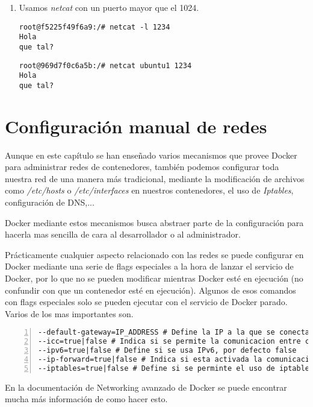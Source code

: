 \begin{enumerate}
\begin{enumerate}
			\item Usamos \textit{netcat} con un puerto mayor que el 1024.
			\begin{lstlisting}[style=consola]
root@f5225f49f6a9:/# netcat -l 1234
Hola
que tal?
			\end{lstlisting}
			\begin{lstlisting}[style=consola]
root@969d7f0c6a5b:/# netcat ubuntu1 1234
Hola
que tal?
			\end{lstlisting}
		\end{enumerate}
	\end{enumerate}
	
	\section{Configuración manual de redes}
	Aunque en este capítulo se han enseñado varios mecanismos que provee Docker para administrar redes de contenedores, también podemos configurar toda nuestra red de una manera más tradicional, mediante la modificación de archivos como \emph{/etc/hosts} o \emph{/etc/interfaces} en nuestros contenedores, el uso de \emph{Iptables}, configuración de DNS,... 
	
	Docker mediante estos mecanismos busca abstraer parte de la configuración para hacerla mas sencilla de cara al desarrollador o al administrador.
	
	Prácticamente cualquier aspecto relacionado con las redes se puede configurar en Docker mediante una serie de flags especiales a la hora de lanzar el servicio de Docker, por lo que no se pueden modificar mientras Docker esté en ejecución (no confundir con que un contenedor esté en ejecución). Algunos de esos comandos con flags especiales solo se pueden ejecutar con el servicio de Docker parado. Varios de los mas importantes son.
	
	\begin{lstlisting}[style=consola,numbers=left]
--default-gateway=IP_ADDRESS # Define la IP a la que se conectaran los contenedores de Docker al crearse, por defecto se usa la de docker0
--icc=true|false # Indica si se permite la comunicacion entre contenedores, por defecto true
--ipv6=true|false # Define si se usa IPv6, por defecto false
--ip-forward=true|false # Indica si esta activada la comunicacion entre los contenedores y el exterior, por defecto true
--iptables=true|false # Define si se perminte el uso de iptables (filtra direcciones y puertos, se usa como firewall en sistemas tipo UNIX)
	\end{lstlisting}
	
	En la documentación de Networking avanzado de Docker \cite{docker-network-advanced} se puede encontrar mucha más información de como hacer esto.
	